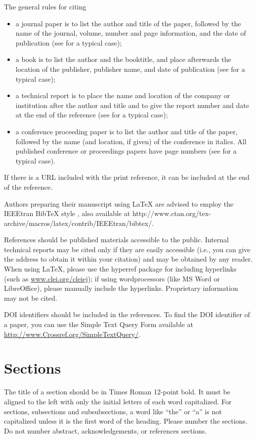 \documentclass{cleiej}
\begin{document}
The general rules for citing
\begin{itemize}
\item  a journal paper is to list the author and title of the paper, followed by the name of the journal, volume, number and page information, and the date of publication (see \cite{IEEEexample:article_typical} for a typical case); 
\item  a book is to list the author and the booktitle, and place afterwards the location of the publisher, publisher name, and date of publication (see \cite{IEEEexample:book} for a typical case);
\item  a technical report is to place the name and location of the company or institution after the author and title and to give the report number and date at the end of the reference (see \cite{IEEEexample:techrep} for a typical case);
\item  a conference proceeding paper is to list the author and title of the paper, followed by the name (and location, if given) of the conference in italics. All published conference or proceedings papers have page numbers (see \cite{IEEEexample:conf_typical} for a typical case).
\end{itemize}
If there is a URL included with the print reference, it can be included at the end of the reference.

Authors preparing their manuscript using LaTeX are advised to employ  the IEEEtran BibTeX style \cite{IEEEhowto:IEEEtranpage}, also available at http://www.ctan.org/tex-archive/macros/latex/contrib/IEEEtran/bibtex/.

References should be published materials accessible to the public. Internal technical reports 
may be cited only if they are easily accessible (i.e., you can give the address to obtain 
it within your citation) and may be obtained by any reader. When using LaTeX, please use the hyperref package for including hyperlinks (such as \url{www.clei.org/cleiej}); if using wordprocessors (like MS Word or LibreOffice), please manually include the hyperlinks.
Proprietary information may not be cited. 

DOI identifiers should be included in the references. To find the DOI identifier of a paper, you can use the Simple Text Query Form available at \url{http://www.Crossref.org/SimpleTextQuery/}. 

\section{Sections}
The title of a section should be in Times Roman 12-point bold. It must be aligned 
to the left with only the initial letters of each word capitalized. For sections, 
subsections and subsubsections, a word like ``the'' or ``a'' is not capitalized unless it is the 
first word of the heading. Please number the sections.  Do not number abstract, acknowledgements, 
or references sections.  
\end{document}
